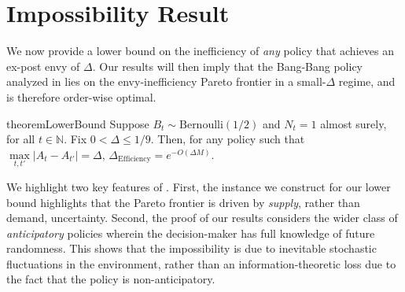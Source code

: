 \documentclass[mnsc,nonblindrev]{informs3}
\newcommand{\ALG}{{Bang-Bang}\xspace}
\newcommand{\Deff}{\Delta_{\text{Efficiency}}\xspace}
\begin{document}
\section{Impossibility Result}
\label{sec:impossibility}

We now provide a lower bound on the inefficiency of {\it any} policy that achieves an ex-post envy of $\Delta$. Our results will then imply that the \ALG policy analyzed in  lies on the envy-inefficiency Pareto frontier in a small-$\Delta$ regime, and is therefore order-wise optimal.

\begin{restatable}{theorem}{LowerBound} \label{thm:main_lower_bound}
Suppose $B_t \sim \text{Bernoulli}(1/2)$ and $N_t = 1$ almost surely, for all $t \in \mathbb{N}$.  Fix $0 < \Delta \leq 1/9$. Then, for any policy such that $\max\limits_{t,t'}|A_t - A_{t'}| = \Delta$, {$\Deff = e^{-O(\Delta M)}$.}
\end{restatable}

We highlight two key features of . First, the instance we construct for our lower bound highlights that the Pareto frontier is driven by {\it supply}, rather than demand, uncertainty. Second, the proof of our results considers the wider class of \emph{anticipatory} policies wherein the decision-maker has full knowledge of future randomness. This shows that the impossibility is due to inevitable stochastic fluctuations in the environment, rather than an information-theoretic loss due to the fact that the policy is non-anticipatory. 
\end{document}
